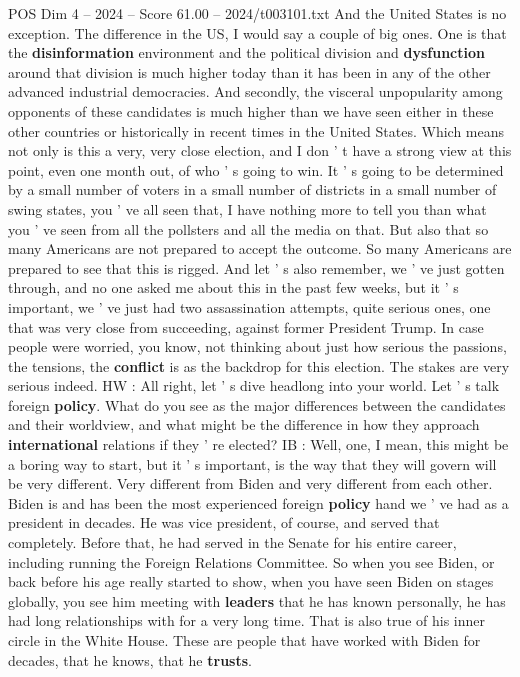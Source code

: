 \begin{textsample}{POS Dim 4 – 2024 – Score 61.00 – 2024/t003101.txt}
And the United States is no exception.
The difference in the US, I would say a couple of big ones.
One is that the \textbf{disinformation} environment and the political division and \textbf{dysfunction} around that division is much higher today than it has been in any of the other advanced industrial democracies.
And secondly, the visceral unpopularity among opponents of these candidates is much higher than we have seen either in these other countries or historically in recent times in the United States.
Which means not only is this a very, very close election, and I don ' t have a strong view at this point, even one month out, of who ' s going to win.
It ' s going to be determined by a small number of voters in a small number of districts in a small number of swing states, you ' ve all seen that, I have nothing more to tell you than what you ' ve seen from all the pollsters and all the media on that.
But also that so many Americans are not prepared to accept the outcome.
So many Americans are prepared to see that this is rigged.
And let ' s also remember, we ' ve just gotten through, and no one asked me about this in the past few weeks, but it ' s important, we ' ve just had two assassination attempts, quite serious ones, one that was very close from succeeding, against former President Trump.
In case people were worried, you know, not thinking about just how serious the passions, the tensions, the \textbf{conflict} is as the backdrop for this election.
The stakes are very serious indeed.
HW : All right, let ' s dive headlong into your world.
Let ' s talk foreign \textbf{policy}.
What do you see as the major differences between the candidates and their worldview, and what might be the difference in how they approach \textbf{international} relations if they ' re elected?
IB : Well, one, I mean, this might be a boring way to start, but it ' s important, is the way that they will govern will be very different.
Very different from Biden and very different from each other.
Biden is and has been the most experienced foreign \textbf{policy} hand we ' ve had as a president in decades.
He was vice president, of course, and served that completely.
Before that, he had served in the Senate for his entire career, including running the Foreign Relations Committee.
So when you see Biden, or back before his age really started to show, when you have seen Biden on stages globally, you see him meeting with \textbf{leaders} that he has known personally, he has had long relationships with for a very long time.
That is also true of his inner circle in the White House.
These are people that have worked with Biden for decades, that he knows, that he \textbf{trusts}.

\end{textsample}
